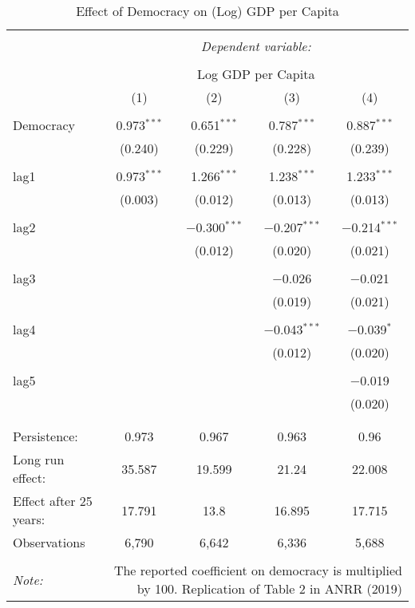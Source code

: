 
\begin{table}[!htbp] \centering 
  \caption{Effect of Democracy on (Log) GDP per Capita} 
  \label{} 
\begin{tabular}{@{\extracolsep{5pt}}lcccc} 
\\[-1.8ex]\hline 
\hline \\[-1.8ex] 
 & \multicolumn{4}{c}{\textit{Dependent variable:}} \\ 
\cline{2-5} 
\\[-1.8ex] & \multicolumn{4}{c}{Log GDP per Capita} \\ 
 & (1) & (2) & (3) & (4) \\ 
\hline \\[-1.8ex] 
 Democracy & 0.973$^{***}$ & 0.651$^{***}$ & 0.787$^{***}$ & 0.887$^{***}$ \\ 
  & (0.240) & (0.229) & (0.228) & (0.239) \\ 
  & & & & \\ 
 lag1 & 0.973$^{***}$ & 1.266$^{***}$ & 1.238$^{***}$ & 1.233$^{***}$ \\ 
  & (0.003) & (0.012) & (0.013) & (0.013) \\ 
  & & & & \\ 
 lag2 &  & $-$0.300$^{***}$ & $-$0.207$^{***}$ & $-$0.214$^{***}$ \\ 
  &  & (0.012) & (0.020) & (0.021) \\ 
  & & & & \\ 
 lag3 &  &  & $-$0.026 & $-$0.021 \\ 
  &  &  & (0.019) & (0.021) \\ 
  & & & & \\ 
 lag4 &  &  & $-$0.043$^{***}$ & $-$0.039$^{*}$ \\ 
  &  &  & (0.012) & (0.020) \\ 
  & & & & \\ 
 lag5 &  &  &  & $-$0.019 \\ 
  &  &  &  & (0.020) \\ 
  & & & & \\ 
\hline \\[-1.8ex] 
Persistence:  & 0.973 & 0.967 & 0.963 & 0.96 \\ 
Long run effect:  & 35.587 & 19.599 & 21.24 & 22.008 \\ 
Effect after 25 years:  & 17.791 & 13.8 & 16.895 & 17.715 \\ 
Observations & 6,790 & 6,642 & 6,336 & 5,688 \\ 
\hline 
\hline \\[-1.8ex] 
\textit{Note:}  & \multicolumn{4}{r}{The reported coefficient on democracy is multiplied by 100. Replication of Table 2 in ANRR (2019)} \\ 
\end{tabular} 
\end{table} 
